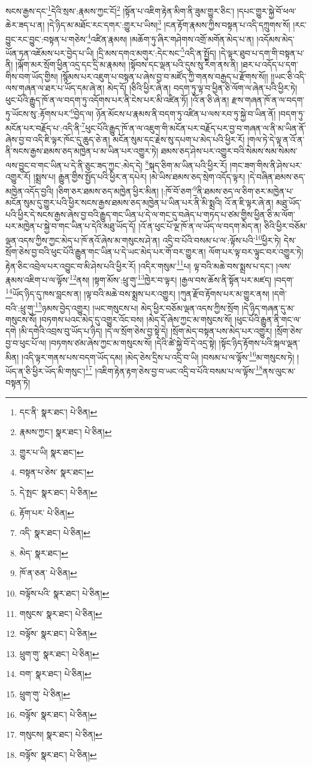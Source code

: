 སངས་རྒྱས་དང་\footnote{དང་ནི་  སྣར་ཐང་།  པེ་ཅིན། }དེའི་སྲས་:རྣམས་ཀྱང་ངོ།\footnote{རྣམས་ཀྱང་།  སྣར་ཐང་།  པེ་ཅིན། } །སྟོན་པ་འཇིག་རྟེན་མིག་ནི་ཟུམ་གྱུར་ཅིང་། །དཔང་གྱུར་སྐྱེ་བོ་ཕལ་ཆེར་ཟད་པ་ན། །དེ་ཉིད་མ་མཐོང་རང་དགར་:གྱུར་པ་ཡིས།\footnote{གྱུར་པ་ཡི།  སྣར་ཐང་། } །ངན་རྟོག་རྣམས་ཀྱིས་བསྟན་པ་འདི་དཀྲུགས་སོ། །རང་བྱུང་རང་བྱུང་:བསྟན་པ་གཅེས་\footnote{བསྟན་པ་ཅེས་  སྣར་ཐང་། }འཛིན་རྣམས། །མཆོག་ཏུ་ཞིར་གཤེགས་འགྲོ་མགོན་མེད་པ་ན། །འདོམས་མེད་ཡོན་ཏན་འཇོམས་པར་བྱེད་པ་ཡི། །དྲི་མས་དགའ་མགུར་:དེང་སང་\footnote{དེ་སྤང་  སྣར་ཐང་།  པེ་ཅིན། }འདི་ན་སྤྱོད། །དེ་ལྟར་ཐུབ་པ་དག་གི་བསྟན་པ་ནི། །ལྐོག་མར་སྲོག་ཕྱིན་འདྲ་དང་དྲི་མ་རྣམས། །སྟོབས་དང་ལྡན་པའི་དུས་སུ་རིག་ནས་ནི། །ཐར་པ་འདོད་པ་དག་གིས་བག་ཡོད་གྱིས། །སྙོམས་པར་འཇུག་པ་བསྟན་པ་ཞེས་བྱ་བ་མཛོད་ཀྱི་གནས་བརྒྱད་པ་རྫོགས་སོ།། །།ཡང་ཅི་འདི་ལས་གཞན་ལ་ཐར་པ་ཡོད་དམ་ཞེ་ན། མེད་དོ། །ཅིའི་ཕྱིར་ཞེ་ན། བདག་ཏུ་ལྟ་བ་ཕྱིན་ཅི་ལོག་ལ་ཞེན་པའི་ཕྱིར་ཏེ། ཕུང་པོའི་རྒྱུད་ཁོ་ན་ལ་བདག་ཏུ་འདོགས་པར་ནི་ངེས་པར་མི་འཛིན་ཏོ། །འོ་ན་ཅི་ཞེ་ན། རྫས་གཞན་ཁོ་ན་ལ་བདག་ཏུ་ཡོངས་སུ་:རྟོགས་པར་\footnote{རྟོག་པར་  པེ་ཅིན། }བྱེད་ལ། ཉོན་མོངས་པ་རྣམས་ནི་བདག་ཏུ་འཛིན་པ་ལས་རབ་ཏུ་སྐྱེ་བ་ཡིན་ནོ། །བདག་ཏུ་མངོན་པར་བརྗོད་པ་:འདི་ནི་\footnote{འདི་  སྣར་ཐང་།  པེ་ཅིན། }ཕུང་པོའི་རྒྱུད་ཁོ་ན་ལ་འཇུག་གི་མངོན་པར་བརྗོད་པར་བྱ་བ་གཞན་ལ་ནི་མ་ཡིན་ནོ་ཞེས་བྱ་བ་འདི་ཇི་ལྟར་ཁོང་དུ་ཆུད་ཅེ་ན། མངོན་སུམ་དང་རྗེས་སུ་དཔག་པ་མེད་པའི་ཕྱིར་རོ། །གལ་ཏེ་དེ་ལྟ་ན་འོ་ན་ནི་སངས་རྒྱས་ཐམས་ཅད་མཁྱེན་པ་མ་ཡིན་པར་འགྱུར་ཏེ། ཐམས་ཅད་ཤེས་པར་འགྱུར་བའི་སེམས་སམ་སེམས་ལས་བྱུང་བ་གང་ཡིན་པ་དེ་ནི་ཅུང་ཟད་ཀྱང་:མེད་དེ། \footnote{མེད་  སྣར་ཐང་། }སྐད་ཅིག་མ་ཡིན་པའི་ཕྱིར་རོ། །གང་ཟག་གིས་ནི་ཤེས་པར་འགྱུར་རོ། །སྨྲས་པ། རྒྱུན་གྱིས་སྤྱོད་པའི་ཕྱིར་ན་དཔེར། །མེ་ཡིས་ཐམས་ཅད་སྲེག་འདོད་ལྟར། །དེ་བཞིན་ཐམས་ཅད་མཁྱེན་འདོད་བྱའི། །ཅིག་ཅར་ཐམས་ཅད་མཁྱེན་ཕྱིར་མིན། །:ཁོ་བོ་ཅག་\footnote{ཁོ་ན་ཅན་  པེ་ཅིན། }ནི་ཐམས་ཅད་ལ་ཅིག་ཅར་མཁྱེན་པ་མངོན་སུམ་དུ་གྱུར་པའི་ཕྱིར་སངས་རྒྱས་ཐམས་ཅད་མཁྱེན་པ་ཡིན་པར་ནི་མི་སྨྲའི། འོ་ན་ཇི་ལྟར་ཞེ་ན། མཐུ་ཡོད་པའི་ཕྱིར་དེ་སངས་རྒྱས་ཞེས་བྱ་བའི་རྒྱུད་གང་ཡིན་པ་དེ་ལ་གང་དུ་བཞེད་པ་གཏད་པ་ཙམ་གྱིས་ཕྱིན་ཅི་མ་ལོག་པར་མཁྱེན་པ་སྐྱེ་བ་གང་ཡིན་པ་དེའི་མཐུ་ཡོད་དོ། །འོ་ན་ཕུང་པོ་ལྔ་ཁོ་ན་ལ་ཡོད་ལ་བདག་མེད་ན། ཅིའི་ཕྱིར་བཅོམ་ལྡན་འདས་ཀྱིས་ཀྱང་མེད་པ་ཁོ་ནའོ་ཞེས་མ་གསུངས་ཤེ་ན། འདྲི་བ་པོའི་བསམ་པ་ལ་:ལྟོས་པའི་\footnote{བལྟོས་པའི་  སྣར་ཐང་།  པེ་ཅིན། }ཕྱིར་ཏེ། དེས་སྲོག་ཅེས་བྱ་བའི་ཕུང་པོའི་རྒྱུན་གང་ཡིན་པ་དེ་ཡང་མེད་པར་གོ་བར་གྱུར་ན། ལོག་པར་ལྟ་བར་ལྟུང་བར་འགྱུར་ཏེ། རྟེན་ཅིང་འབྲེལ་པར་འབྱུང་བ་མི་ཤེས་པའི་ཕྱིར་རོ། །འདིར་གསུམ་\footnote{གསུངས་  སྣར་ཐང་།  པེ་ཅིན། }པ། ལྟ་བའི་མཆེ་བས་སྨྲས་པ་དང་། །ལས་རྣམས་འཇིག་པ་ལ་ལྟོས་\footnote{བལྟོས་  སྣར་ཐང་།  པེ་ཅིན། }ནས། །སྟག་མོས་:ཕྲུ་གུ་\footnote{ཕྲུག་གུ་  སྣར་ཐང་།  པེ་ཅིན། }ཁྱེར་བ་ལྟར། །རྒྱལ་བས་ཆོས་ནི་སྟོན་པར་མཛད། །བདག་\footnote{བག་  སྣར་ཐང་།  པེ་ཅིན། }ཡོད་ཉིད་དུ་ཁས་བླངས་ན། །ལྟ་བའི་མཆེ་བས་སྨྲས་པར་འགྱུར། །ཀུན་རྫོབ་རྟོགས་པར་མ་གྱུར་ནས། །དགེ་བའི་:ཕྲུ་གུ་\footnote{ཕྲུག་གུ་  པེ་ཅིན། }ཉམས་བྱེད་འགྱུར། །ཡང་གསུངས་པ། མེད་ཕྱིར་བཅོམ་ལྡན་འདས་ཀྱིས་སྲོག །དེ་ཉིད་གཞན་དུ་མ་གསུངས་སོ། །བཏགས་པའང་མེད་དུ་འགྱུར་འོང་བས། །མེད་དོ་ཞེས་ཀྱང་མ་གསུངས་སོ། །ཕུང་པོའི་རྒྱུན་ནི་གང་ལ་དགེ །མི་དགེའི་འབྲས་བུ་ཡོད་པ་ཉིད། །དེ་ལ་སྲོག་ཅེས་བྱ་སྟེ་དེ། །སྲོག་མེད་བསྟན་པས་མེད་པར་འགྱུར། །སྲོག་ཅེས་བྱ་བ་ཕུང་པོ་ལ། །བཏགས་ཙམ་ཞེས་ཀྱང་མ་གསུངས་སོ། །དེའི་ཚེ་སྐྱེ་བོ་དེ་འདྲ་སྟེ། །སྟོང་ཉིད་རྟོགས་པའི་སྐལ་ལྡན་མིན། །འདི་ལྟར་གནས་པས་བདག་ཡོད་དམ། །མེད་ཅེས་དྲིས་པ་འདྲི་བ་ཡི། །བསམ་པ་ལ་ལྟོས་\footnote{བལྟོས་  སྣར་ཐང་།  པེ་ཅིན། }མ་གསུངས་ཏེ། །ཡོད་ན་ཅི་ཕྱིར་ཡོད་མི་གསུང་།\footnote{གསུངས།  སྣར་ཐང་།  པེ་ཅིན། } །འཇིག་རྟེན་རྟག་ཅེས་བྱ་བ་ཡང་འདྲི་བ་པོའི་བསམ་པ་ལ་ལྟོས་\footnote{བལྟོས་  སྣར་ཐང་།  པེ་ཅིན། }ནས་ལུང་མ་བསྟན་ཏེ། 